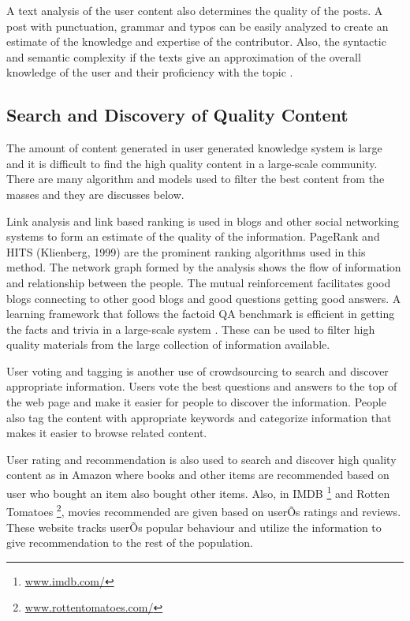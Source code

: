 A text analysis of the user content also determines the quality of the posts. A post with punctuation, grammar and typos can be easily analyzed to create an estimate of the knowledge and expertise of the contributor. Also, the syntactic and semantic complexity if the texts give an approximation of the overall knowledge of the user and their proficiency with the topic \cite{agichtein2008finding}.


\subsection{Search and Discovery of Quality Content}

The amount of content generated in user generated knowledge system is large and it is difficult to find the high quality content in a large-scale community. There are many algorithm and models used to filter the best content from the masses and they are discusses below.

Link analysis and link based ranking is used in blogs and other social networking systems to form an estimate of the quality of the information. PageRank \cite{page1999pagerank} and HITS (Klienberg, 1999) are the prominent ranking algorithms used in this method. The network graph formed by the analysis shows the flow of information and relationship between the people. The mutual reinforcement facilitates good blogs connecting to other good blogs and good questions getting good answers. A learning framework that follows the factoid QA benchmark is efficient in getting the facts and trivia in a large-scale system \cite{bian2008finding}. These can be used to filter high quality materials from the large collection of information available.

User voting and tagging is another use of crowdsourcing to search and discover appropriate information. Users vote the best questions and answers to the top of the web page and make it easier for people to discover the information. People also tag the content with appropriate keywords and categorize information that makes it easier to browse related content. 

User rating and recommendation is also used to search and discover high quality content as in Amazon where books and other items are recommended based on user who bought an item also bought other items. Also, in IMDB \footnote{\url{www.imdb.com/}} and Rotten Tomatoes \footnote{\url{www.rottentomatoes.com/}}, movies recommended are given based on userÕs ratings and reviews. These website tracks userÕs popular behaviour and utilize the information to give recommendation to the rest of the population.


